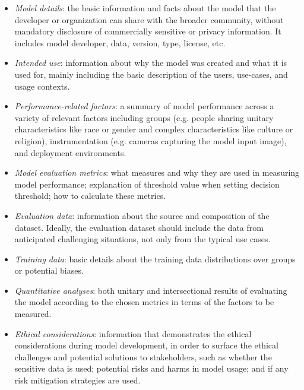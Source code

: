 \documentclass[conference]{IEEEtran}
\begin{document}
\begin{itemize}
\item \textit{Model details}: the basic information and facts about the model that the developer or organization can share with the broader community, without mandatory disclosure of commercially sensitive or privacy information. It includes model developer, data, version, type, license, etc. 
\item \textit{Intended use}: information about why the model was created and what it is used for, mainly including the basic description of the users, use-cases, and usage contexts.
\item \textit{Performance-related factors}: a summary of model performance across a variety of relevant factors including groups (e.g. people sharing unitary characteristics like race or gender and complex characteristics like culture or religion), instrumentation (e.g. cameras capturing the model input image), and deployment environments. 
\item \textit{Model evaluation metrics}: what measures and why they are used in measuring model performance; explanation of threshold value when setting decision threshold; how to calculate these metrics. 
\item \textit{Evaluation data}: information about the source and composition of the dataset. Ideally, the evaluation dataset should include the data from anticipated challenging situations, not only from the typical use cases. 
\item \textit{Training data}: basic details about the training data distributions over groups or potential biases.
\item \textit{Quantitative analyses}: both unitary and intersectional results of evaluating the model according to the chosen metrics in terms of the factors to be measured. 
\item \textit{Ethical considerations}: information that demonstrates the ethical considerations during model development, in order to surface the ethical challenges and potential solutions to stakeholders, such as whether the sensitive data is used; potential risks and harms in model usage; and if any risk mitigation strategies are used. 
\end{itemize}
\end{document}
